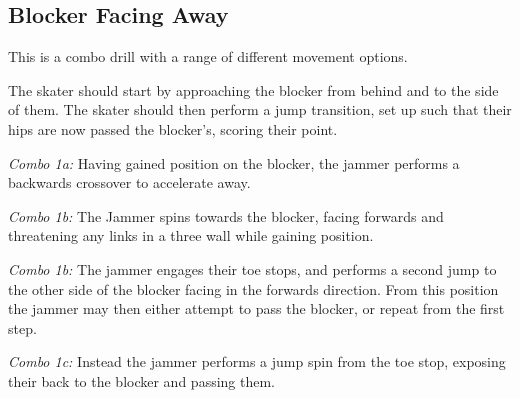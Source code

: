 \subsection*{Blocker Facing Away}
\label{drill:jammer_movement/jump_jukes/blocker_facing_away}

This is a combo drill with a range of different movement options.

The skater should start by approaching the blocker from behind and to the side of them. 
The skater should then perform a jump transition, set up such that their hips are now passed the blocker's, scoring their point.

{\it Combo 1a:}
Having gained position on the blocker, the jammer performs a backwards crossover to accelerate away. 

{\it Combo 1b:}
The Jammer spins towards the blocker, facing forwards and threatening any links in a three wall while gaining position.

{\it Combo 1b:}
The jammer engages their toe stops, and performs a second jump to the other side of the blocker facing in the forwards direction. 
From this position the jammer may then either attempt to pass the blocker, or repeat from the first step.

{\it Combo 1c:}
Instead the jammer performs a jump spin from the toe stop, exposing their back to the blocker and passing them. 
